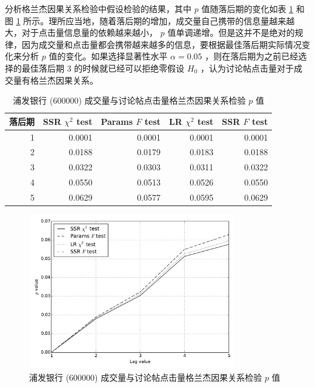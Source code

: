 分析格兰杰因果关系检验中假设检验的结果，其中 $p$ 值随落后期的变化如表 \ref{f_test:10} 和图 \ref{f_test:11} 所示。理所应当地，随着落后期的增加，成交量自己携带的信息量越来越大，对于点击量信息量的依赖越来越小， $p$ 值单调递增。但是这并不是绝对的规律，因为成交量和点击量都会携带越来越多的信息，要根据最佳落后期实际情况变化来分析 $p$ 值的变化。如果选择显著性水平 $\alpha=0.05$ ，则在落后期为之前已经选择的最佳落后期 $3$ 的时候就已经可以拒绝零假设 $H_{0}$ ，认为讨论帖点击量对于成交量有格兰杰因果关系。

\begin{table}
  \centering
  \caption{浦发银行 (600000) 成交量与讨论帖点击量格兰杰因果关系检验 $p$ 值}
  \label{f_test:10}
  \begin{tabular}{rrrrr}
    \toprule
    落后期 & SSR $\chi^{2}$ test & Params $F$ test & LR $\chi^{2}$ test & SSR $F$ test \\
    \midrule
    1 & 0.0001 & 0.0001 & 0.0001 & 0.0001 \\
    2 & 0.0188 & 0.0179 & 0.0183 & 0.0188 \\
    3 & 0.0322 & 0.0303 & 0.0311 & 0.0322 \\
    4 & 0.0550 & 0.0513 & 0.0526 & 0.0550 \\
    5 & 0.0629 & 0.0577 & 0.0595 & 0.0629 \\
    \bottomrule
  \end{tabular}
\end{table}

\begin{figure}
  \centering
  \includegraphics[width=0.8\textwidth]{plots/granger_causality_test_1.pdf}
  \caption{浦发银行 (600000) 成交量与讨论帖点击量格兰杰因果关系检验 $p$ 值}
  \label{f_test:11}
\end{figure}

